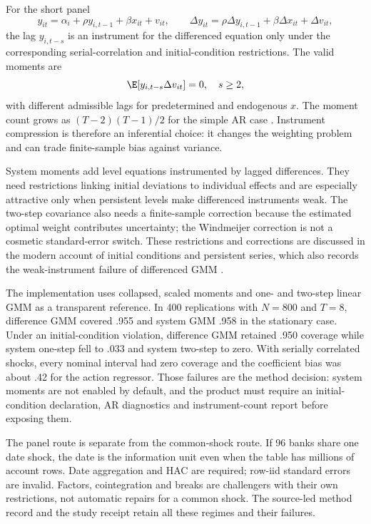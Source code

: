 For the short panel
\[
 y_{it}=\alpha_i+\rho y_{i,t-1}+\beta x_{it}+v_{it},\qquad
 \Delta y_{it}=\rho\Delta y_{i,t-1}+\beta\Delta x_{it}+\Delta v_{it},
\]
the lag $y_{i,t-s}$ is an instrument for the differenced equation only under
the corresponding serial-correlation and initial-condition restrictions. The
valid moments are
\[
 \E[y_{i,t-s}\Delta v_{it}]=0,\quad s\geq2,
\]
with different admissible lags for predetermined and endogenous $x$. The
moment count grows as $(T-2)(T-1)/2$ for the simple AR case
\citep{arellano1991}. Instrument compression is therefore an inferential
choice: it changes the weighting problem and can trade finite-sample bias
against variance.

System moments add level equations instrumented by lagged differences. They
need restrictions linking initial deviations to individual effects and are
especially attractive only when persistent levels make differenced instruments
weak. The two-step covariance also needs a finite-sample correction because
the estimated optimal weight contributes uncertainty; the Windmeijer correction
is not a cosmetic standard-error switch. These restrictions and corrections
are discussed in the modern account of initial conditions and persistent
series, which also records the weak-instrument failure of differenced GMM
\citep{blundellbond2023}.

The implementation uses collapsed, scaled moments and one- and two-step
linear GMM as a transparent reference. In 400 replications with $N=800$ and
$T=8$, difference GMM covered .955 and system GMM .958 in the stationary
case. Under an initial-condition violation, difference GMM retained .950
coverage while system one-step fell to .033 and system two-step to zero. With
serially correlated shocks, every nominal interval had zero coverage and the
coefficient bias was about .42 for the action regressor. Those failures are
the method decision: system moments are not enabled by default, and the
product must require an initial-condition declaration, AR diagnostics and
instrument-count report before exposing them.

The panel route is separate from the common-shock route. If 96 banks share
one date shock, the date is the information unit even when the table has
millions of account rows. Date aggregation and HAC are required; row-iid
standard errors are invalid. Factors, cointegration and breaks are challengers
with their own restrictions, not automatic repairs for a common shock. The
source-led method record and the study receipt retain all these regimes and
their failures.


